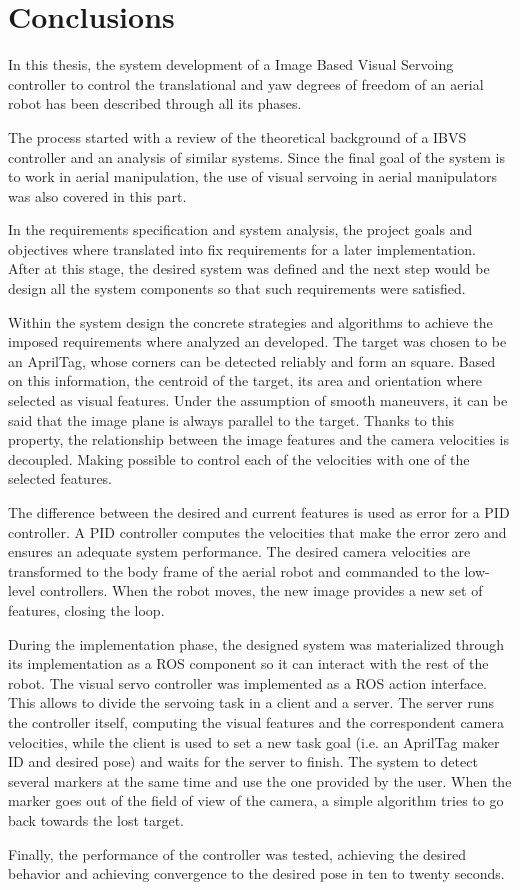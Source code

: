 
\chapter{Conclusions}
\label{chap:conclusions}

In this thesis, the system development of a Image Based Visual Servoing controller to control the translational and yaw degrees of freedom of an aerial robot has been described through all its phases. 

The process started with a review of the theoretical background of a IBVS controller and an analysis of similar systems. Since the final goal of the system is to work in aerial manipulation, the use of visual servoing in aerial manipulators was also covered in this part.

In the requirements specification and system analysis, the project goals and objectives where translated into fix requirements for a later implementation. After at this stage, the desired system was defined and the next step would be design all the system components so that such requirements were satisfied.

Within the system design the concrete strategies and algorithms to achieve the imposed requirements where analyzed an developed. The target was chosen to be an AprilTag, whose corners can be detected reliably and form an square. Based on this information, the centroid of the target, its area and orientation where selected as visual features. Under the assumption of smooth maneuvers, it can be said that the image plane is always parallel to the target. Thanks to this property, the relationship between the image features and the camera velocities is decoupled. Making possible to control each of the velocities with one of the selected features.

The difference between the desired and current features is used as error for a PID controller. A PID controller computes the velocities that make the error zero and ensures an adequate system performance. The desired camera velocities are transformed to the body frame of the aerial robot and commanded to the low-level controllers. When the robot moves, the new image provides a new set of features, closing the loop.

During the implementation phase, the designed system was materialized through its implementation as a ROS component so it can interact with the rest of the robot. The visual servo controller was implemented as a ROS action interface. This allows to divide the servoing task in a client and a server. The server runs the controller itself, computing the visual features and the correspondent camera velocities, while the client is used to set a new task goal (i.e. an AprilTag maker ID and desired pose)  and waits for the server to finish. The system to detect several markers at the same time and use the one provided by the user. When the marker goes out of the field of view of the camera, a simple algorithm tries to go back towards the lost target.

Finally, the performance of the controller was tested, achieving the desired behavior and achieving convergence to the desired pose in ten to twenty seconds.